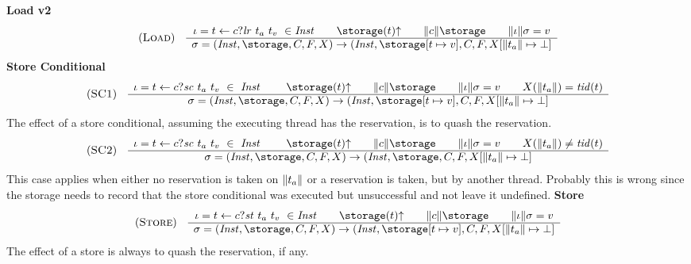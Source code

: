 \noindent \textbf{Load v2} 
  \[
    \begin{array}{cc}
(\mbox{\sc Load})
&
\begin{array}{c}
  \inst =  \ass{c}{t}{\loadr{t_a}{t_v}}  \in \Inst \qquad \fundefined{\storage}{t} \qquad
\den{c}{\storage} \qquad \den{\inst}\newstate = v
\\ \hline
\newstate = (\Inst, \storage, \Commits, \Decodes,\exclusives) \rightarrow (\Inst,\subst{\storage}{t}{v}, \Commits, \Decodes,\exclusives[\den{t_a}\mapsto\bot]
\end{array}\\
\end{array}
\]
%
\noindent \textbf{Store Conditional} 
  \[
    \begin{array}{cc}
(\mbox{\sc SC1})
&
\begin{array}{c}
  \inst =  \ass{c}{t}{\storec{t_a}{t_v}}  \in \Inst \qquad \fundefined{\storage}{t} \qquad
\den{c}{\storage} \qquad \den{\inst}\newstate = v \qquad
\exclusives(\den{t_a}) = \tid(t)
\\ \hline
\newstate = (\Inst, \storage, \Commits, \Decodes,\exclusives) \rightarrow (\Inst,\subst{\storage}{t}{v}, \Commits, \Decodes,\exclusives[\den{t_a}\mapsto\bot]
\end{array}\\
\end{array}
\]
%
The effect of a store conditional, assuming the executing thread has the reservation, is to quash the reservation.
%
  \[
    \begin{array}{cc}
(\mbox{\sc SC2})
&
\begin{array}{c}
  \inst =  \ass{c}{t}{\storec{t_a}{t_v}}  \in \Inst \qquad \fundefined{\storage}{t} \qquad
\den{c}{\storage} \qquad \den{\inst}\newstate = v \qquad
\exclusives(\den{t_a}) \neq \tid(t)
\\ \hline
\newstate = (\Inst, \storage, \Commits, \Decodes,\exclusives) \rightarrow (\Inst,\storage, \Commits, \Decodes,\exclusives[\den{t_a}\mapsto\bot]
\end{array}\\
\end{array}
\]
%
This case applies when either no reservation is taken on $\mbox{$\parallel$} t_a \mbox{$\parallel$}$ or a reservation is taken, but by another thread.
Probably this is wrong since the storage needs to record that the store conditional was executed but unsuccessful and not leave it undefined.
%
\noindent \textbf{Store} 
  \[
    \begin{array}{cc}
(\mbox{\sc Store})
&
\begin{array}{c}
  \inst =  \ass{c}{t}{\store{t_a}{t_v}}  \in \Inst \qquad \fundefined{\storage}{t} \qquad
\den{c}{\storage} \qquad \den{\inst}\newstate = v
\\ \hline
\newstate = (\Inst, \storage, \Commits, \Decodes,\exclusives) \rightarrow (\Inst,\subst{\storage}{t}{v}, \Commits, \Decodes,\exclusives[\den{t_a}\mapsto\bot]
\end{array}\\
\end{array}
\]
%
The effect of a store is always to quash the reservation, if any.
